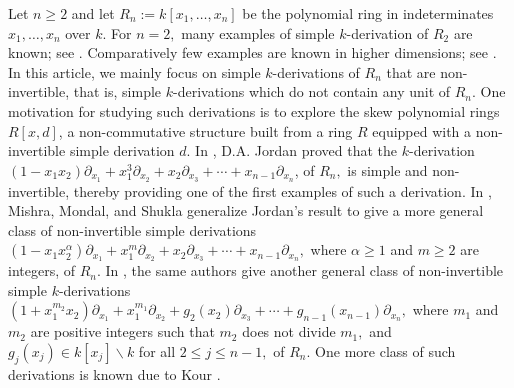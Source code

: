 \documentclass[12pt,reqno]{amsart}
\renewcommand{\setminus}{\smallsetminus}
\renewcommand{\leq}{\leqslant}
\renewcommand{\geq}{\geqslant}
\numberwithin{thm}{section}
\theoremstyle{definition}
\numberwithin{equation}{thm}
\theoremstyle{plain}
\begin{document}
Let $n\geq 2$ and let $R_n:=k[x_1,\ldots,x_n]$ be the polynomial ring in indeterminates $x_1,\ldots,x_n$ over $k.$ For $n=2,$ many examples of simple $k$-derivation of $R_2$ are known; see \cite{Hav09, Now08, Kour14, SP25}. Comparatively few examples are known in higher dimensions; see \cite{Now94, AJA01, Leq08}. In this article, we mainly focus on simple $k$-derivations of $R_n$ that are non-invertible, that is, simple $k$-derivations which do not contain any unit of $R_n.$ One motivation for studying such derivations is to explore the skew polynomial rings $R[x,d]$, a non-commutative structure built from a ring $R$ equipped with a non-invertible simple derivation $d$. In \cite{Jor81}, D.A. Jordan proved that the $k$-derivation $(1-x_1x_2)\partial_{x_1}+x_1^{3}\partial_{x_2}+x_2\partial_{x_3}+\cdots+x_{n-1}\partial_{x_n}$, of $R_n,$ is simple and non-invertible, thereby providing one of the first examples of such a derivation. In \cite{MMS26}, Mishra, Mondal, and Shukla generalize Jordan's result to give a more general class of non-invertible simple derivations $(1-x_1x_2^{\alpha})\partial_{x_1}+x_1^{m}\partial_{x_2}+x_2\partial_{x_3}+\cdots+x_{n-1}\partial_{x_n},$ where $\alpha\geq 1$ and $m\geq 2$ are integers, of $R_n$. In \cite{MMS25'}, the same authors give another general class of non-invertible simple $k$-derivations $(1+x_1^{m_2}x_2)\partial_{x_1}+x_1^{m_1}\partial_{x_2}+g_2(x_2)\partial_{x_3}+\cdots+g_{n-1}(x_{n-1})\partial_{x_n},$ where $m_1$ and $m_2$ are positive integers such that $m_2$ does not divide $m_1,$ and $g_j(x_j)\in k[x_j]\setminus k$ for all $2\leq j \leq n-1,$ of $R_n.$ One more class of such derivations is known due to Kour \cite[Theorem 5.1]{Kour14}. 
\end{document}
